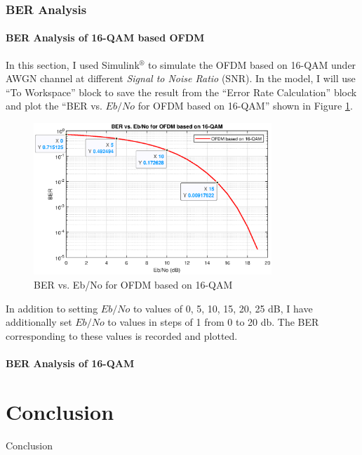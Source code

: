 \documentclass[11pt]{article}
\numberwithin{figure}{section}
\numberwithin{equation}{section}
\begin{document}
\section{BER Analysis}

\subsection{BER Analysis of 16-QAM based OFDM}
In this section, I used Simulink$^\circledR$ to simulate the OFDM based on 16-QAM under AWGN channel at different \textit{Signal to Noise Ratio} (SNR). In the model, I will use ``To Workspace'' block to save the result from the ``Error Rate Calculation'' block and plot the ``BER vs. $Eb/No$ for OFDM based on 16-QAM'' shown in Figure \ref{fig:BER of OFDM-QAM}.
\begin{figure}[!ht]
    \centering
    \includegraphics[width=0.8\textwidth]{images/BER-OFDM-16QAM.eps}
    \caption{BER vs. Eb/No for OFDM based on 16-QAM}
    \label{fig:BER of OFDM-QAM}
\end{figure}

In addition to setting $Eb/No$ to values of 0, 5, 10, 15, 20, 25 dB, I have additionally set $Eb/No$ to values in steps of 1 from 0 to 20 db. The BER corresponding to these values is recorded and plotted.

\subsection{BER Analysis of 16-QAM}



\part{Conclusion}
Conclusion




\end{document}
